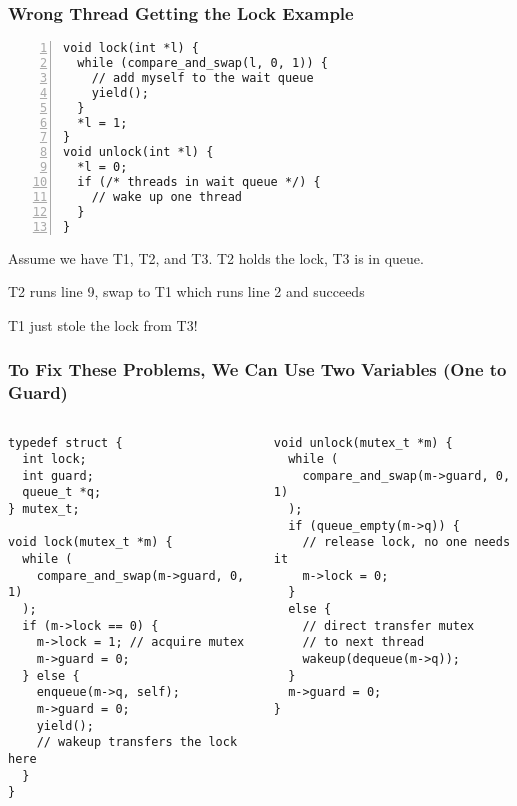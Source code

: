   \begin{frame}[fragile]
    \frametitle{Wrong Thread Getting the Lock Example}

    \begin{lstlisting}[numbers=left]
void lock(int *l) {
  while (compare_and_swap(l, 0, 1)) {
    // add myself to the wait queue
    yield();
  }
  *l = 1;
}
void unlock(int *l) {
  *l = 0;
  if (/* threads in wait queue */) {
    // wake up one thread
  }
}
    \end{lstlisting}

    Assume we have T1, T2, and T3. T2 holds the lock, T3 is in queue.

    \hspace{2em} T2 runs line 9, swap to T1 which runs line 2 and succeeds

    \hspace{4em} T1 just stole the lock from T3!
  \end{frame}

  \begin{frame}[fragile]
    \frametitle{To Fix These Problems, We Can Use Two Variables (One to Guard)}

    \begin{columns}
      \begin{column}{0.5\textwidth}
        \begin{lstlisting}[basicstyle=\scriptsize\ttfamily]
typedef struct {
  int lock;
  int guard;
  queue_t *q;
} mutex_t;

void lock(mutex_t *m) {
  while (
    compare_and_swap(m->guard, 0, 1)
  );
  if (m->lock == 0) {
    m->lock = 1; // acquire mutex
    m->guard = 0;
  } else {
    enqueue(m->q, self);
    m->guard = 0;
    yield();
    // wakeup transfers the lock here
  }
}
        \end{lstlisting}
      \end{column}
      \begin{column}{0.5\textwidth}
        \begin{lstlisting}[basicstyle=\scriptsize\ttfamily]
void unlock(mutex_t *m) {
  while (
    compare_and_swap(m->guard, 0, 1)
  );
  if (queue_empty(m->q)) {
    // release lock, no one needs it
    m->lock = 0; 
  }
  else {
    // direct transfer mutex
    // to next thread
    wakeup(dequeue(m->q));
  }
  m->guard = 0;
}
        \end{lstlisting}
      \end{column}
    \end{columns}
  \end{frame}

